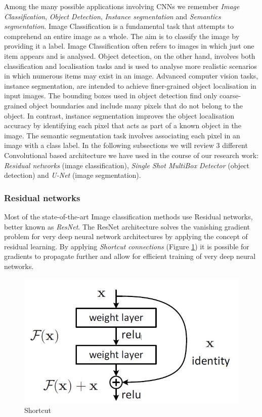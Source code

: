 Among the many possible applications involving CNNs we remember \textit{Image Classification}, \textit{Object Detection}, \textit{Instance segmentation} and \textit{Semantics segmentation}. Image Classification is a fundamental task that attempts to comprehend an entire image as a whole. The aim is to classify the image by providing it a label. Image Classification often refers to images in which just one item appears and is analysed. Object detection, on the other hand, involves both classification and localisation tasks and is used to analyse more realistic scenarios in which numerous items may exist in an image. Advanced computer vision tasks, instance segmentation, are intended to achieve finer-grained object localisation in input images. The bounding boxes used in object detection find only coarse-grained object boundaries and include many pixels that do not belong to the object. In contrast, instance segmentation improves the object localisation accuracy by identifying each pixel that acts as part of a known object in the image. The semantic segmentation task involves associating each pixel in an image with a class label. In the following subsections we will review 3 different Convolutional based architecture we have used in the course of our research work: \textit{Residual networks} (image classification), \textit{Single Shot MultiBox Detector} (object detection) and \textit{U-Net} (image segmentation).

\subsubsection{Residual networks} \label{Residual Networks}

Most of the state-of-the-art Image classification methods use Residual networks, better known as \textit{ResNet}\citep{he2016deep}. The ResNet architecture solves the vanishing gradient problem for very deep neural network architectures by applying the concept of residual learning. By applying \textit{Shortcut connections} (Figure \ref{fig:shortcut}) it is possible for gradients to propagate further and allow for efficient training of very deep neural networks.

\begin{figure}
\centerline{\includegraphics[scale=0.5]{images/chapter_2/residual_learning.jpg}}
\caption{Shortcut \citep{he2016deep}}
\label{fig:shortcut}
\end{figure}

